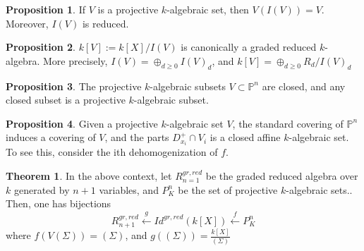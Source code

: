 \documentclass{article}
\theoremstyle{definition}
\newtheorem{theorem}{Theorem}[section]
\theoremstyle{definition}
\theoremstyle{definition}
\theoremstyle{definition}
\newtheorem{proposition}{Proposition}[theorem]
\theoremstyle{definition}
\theoremstyle{definition}
\theoremstyle{definition}
\begin{document}
\begin{tcolorbox}[colback=blue!5!white,colframe=blue!30!white]
\begin{proposition}
If $V$ is a projective $k$-algebraic set, then $V(I(V))=V$. Moreover, $I(V)$ is reduced. 
\end{proposition}
\end{tcolorbox}


\begin{tcolorbox}[colback=blue!5!white,colframe=blue!30!white]
\begin{proposition}
$k[V]:=k[X]/I(V)$ is canonically a graded reduced $k$-algebra. More precisely, $I(V)=\oplus_{d\geq 0}I(V)_d$, and $k[V]=\oplus_{d\geq 0}R_d/I(V)_d$
\end{proposition}
\end{tcolorbox}


\begin{tcolorbox}[colback=blue!5!white,colframe=blue!30!white]
\begin{proposition}
The projective $k$-algebraic subsets $V\subset \mathbb{P}^n$ are closed, and any closed subset is a projective $k$-algebraic subset. 
\end{proposition}
\end{tcolorbox}


\begin{tcolorbox}[colback=blue!5!white,colframe=blue!30!white]
\begin{proposition}
Given a projective $k$-algebraic set $V$, the standard covering of $\mathbb{P}^n$ induces a covering of $V$, and the parts $D_{x_i}^+\cap V_i$ is a closed affine $k$-algebraic set. To see this, consider the ith dehomogenization of $f$. 
\end{proposition}
\end{tcolorbox}



\begin{tcolorbox}[colback=red!5!white,colframe=red!30!white]
\begin{theorem}
In the above context, let $R_{n=1}^{gr, red}$ be the graded reduced algebra over $k$ generated by $n+1$ variables, and $P_K^n$ be the set of projective $k$-algebraic sets.. Then, one has bijections
\[R_{n+1}^{gr, red}\xleftarrow{g} Id^{gr, red}(k[X])\xleftarrow{f} P^n_K\]
where $f(V(\Sigma))=(\Sigma)$, and $g((\Sigma))=\frac{k[X]}{(\Sigma)}$

\end{theorem}
\end{tcolorbox}
\end{document}
